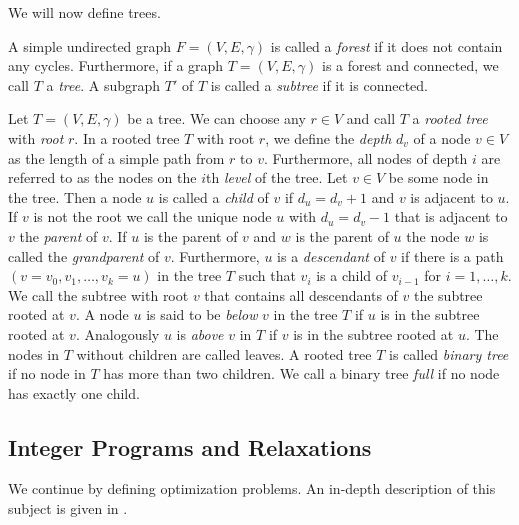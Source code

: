 We will now define trees.

\begin{definition}
	\label{def:treeforest}
	A simple undirected graph $F = (V, E, \gamma)$ is called a \textit{forest} if it does not contain any cycles. Furthermore, if a graph $T = (V, E, \gamma)$ is a forest and connected, we call $T$ a \textit{tree}. A subgraph $T'$ of $T$ is called a \textit{subtree} if it is connected.
\end{definition}

\begin{definition}
	\label{def:binarytree}
	Let $T = (V,E,\gamma)$ be a tree. We can choose any $r \in V$ and call $T$ a \textit{rooted tree} with \textit{root} $r$. In a rooted tree $T$ with root $r$, we define the \textit{depth} $d_v$ of a node $v \in V$ as the length of a simple path from $r$ to $v$. Furthermore, all nodes of depth $i$ are referred to as the nodes on the $i$th \textit{level} of the tree. Let $v \in V$ be some node in the tree. Then a node $u$ is called a \textit{child} of $v$ if $d_u = d_v + 1$ and $v$ is adjacent to $u$. If $v$ is not the root we call the unique node $u$ with $d_u = d_v - 1$ that is adjacent to $v$ the \textit{parent} of $v$. If $u$ is the parent of $v$ and $w$ is the parent of $u$ the node $w$ is called the \textit{grandparent} of $v$. Furthermore, $u$ is a \textit{descendant} of $v$ if there is a path $(v = v_0, v_1, \ldots, v_k = u)$ in the tree $T$ such that $v_i$ is a child of $v_{i-1}$ for $i= 1, \dots, k$. We call the subtree with root $v$ that contains all descendants of $v$ the subtree rooted at $v$. A node $u$ is said to be \textit{below} $v$ in the tree $T$ if $u$ is in the subtree rooted at $v$. Analogously $u$ is \textit{above} $v$ in $T$ if $v$ is in the subtree rooted at $u$. The nodes in $T$ without children are called leaves. A rooted tree $T$ is called \textit{binary tree} if no node in $T$ has more than two children. We call a binary tree \textit{full} if no node has exactly one child.
\end{definition}

\subsection{Integer Programs and Relaxations}
\label{sec:def:integer}

We continue by defining optimization problems. An in-depth description of this subject is given in \cite{Wol97}.

